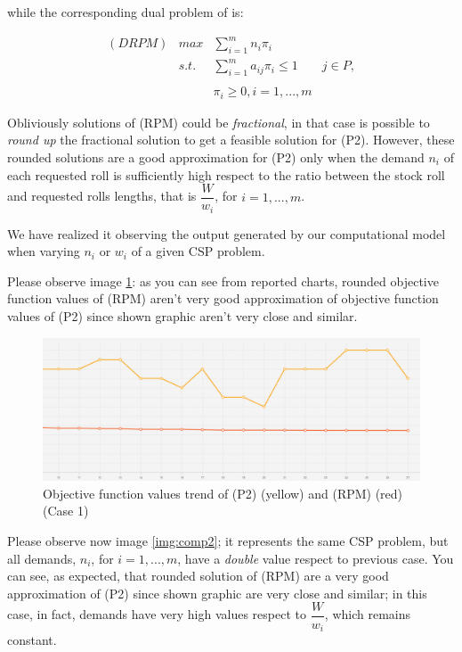 \documentclass[10pt,a4paper]{article}
\begin{document}
while the corresponding dual problem of is:

\begin{equation}\label{eqn:DLPM}
\begin{array} {lllr} 
(DRPM) & max & \displaystyle\sum_{i = 1}^{m} n_i\pi_i & \\
& s.t. & \displaystyle\sum_{i = 1}^{m} a_{ij}\pi_i \leq 1 & j \in P, \\\\
&& \pi_i \geq 0, i = 1,...,m &
\end{array}
\end{equation}

Obliviously solutions of (RPM) could be \textit{fractional}, in that case is possible to \textit{round up} the fractional solution to get a feasible solution for (P2). However, these rounded solutions are a good approximation for (P2) only when the demand $n_i$ of each requested roll is sufficiently high respect to the ratio between the stock roll and requested rolls lengths, that is $\dfrac{W}{w_i}$, for $i = 1,...,m$.

We have realized it observing the output generated by our computational model when varying $n_i$ or $w_i$ of a given CSP problem.

Please observe image \ref{img:comp1}: as you can see from reported charts, rounded objective function values of (RPM) aren't very good approximation of objective function values of (P2) since shown graphic aren't very close and similar.

\begin{figure}[H]
\label{img:comp1}
\includegraphics[width=\textwidth]{./images/comparation0.png}
\centering
\caption{Objective function values trend of (P2) (yellow) and (RPM) (red) (Case 1)}
\end{figure}

Please observe now image \ref{img:comp2}; it represents the same CSP problem, but all demands, $n_i$, for $i = 1,...,m$, have a \textit{double} value respect to previous case. You can see, as expected, that rounded solution of (RPM) are a very good approximation of (P2) since shown graphic are very close and similar; in this case, in fact, demands have very high values respect to $\dfrac{W}{w_i}$, which remains constant.
\end{document}
